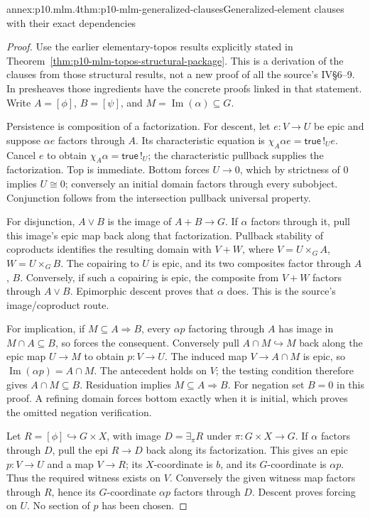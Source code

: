 \begin{annexitem}{annex:p10.mlm.4}{thm:p10-mlm-generalized-clauses}{Generalized-element clauses with their exact dependencies}
\begin{proof}
Use the earlier elementary-topos results explicitly stated in
Theorem~\ref{thm:p10-mlm-topos-structural-package}.
This is a derivation of the clauses from those structural results, not a
new proof of all the source's IV\S6--9. In presheaves those ingredients have
the concrete proofs linked in that statement.
Write \(A=[\phi]\), \(B=[\psi]\), and \(M=\operatorname{Im}(\alpha)\subseteq G\).

Persistence is composition of a factorization. For descent, let \(e:V\to U\)
be epic and suppose \(\alpha e\) factors through \(A\). Its characteristic
equation is \(\chi_A\alpha e=\mathsf{true}\,!_Ue\). Cancel \(e\) to obtain
\(\chi_A\alpha=\mathsf{true}\,!_U\); the characteristic pullback supplies
the factorization. Top is immediate. Bottom forces \(U\to0\), which by
strictness of \(0\) implies \(U\cong0\); conversely an initial domain
factors through every subobject. Conjunction follows from the intersection
pullback universal property.

For disjunction, \(A\vee B\) is the image of \(A+B\to G\).
If \(\alpha\) factors through it, pull this image's epic map back along that
factorization. Pullback stability of coproducts identifies the resulting
domain with \(V+W\), where \(V=U\times_G A\), \(W=U\times_G B\).
The copairing to \(U\) is epic, and its two composites factor through \(A\),
\(B\). Conversely, if such a copairing is epic, the composite from \(V+W\)
factors through \(A\vee B\). Epimorphic descent proves that \(\alpha\) does.
This is the source's image/coproduct route.

For implication, if \(M\subseteq A\Rightarrow B\), every \(\alpha p\) factoring
through \(A\) has image in \(M\cap A\subseteq B\), so forces the consequent.
Conversely pull \(A\cap M\hookrightarrow M\) back along the epic map
\(U\to M\) to obtain \(p:V\to U\). The induced map \(V\to A\cap M\) is
epic, so \(\operatorname{Im}(\alpha p)=A\cap M\). The antecedent holds
on \(V\); the testing condition therefore gives \(A\cap M\subseteq B\).
Residuation implies \(M\subseteq A\Rightarrow B\).
For negation set \(B=0\) in this proof. A refining domain forces bottom
exactly when it is initial, which proves the omitted negation verification.

Let \(R=[\phi]\hookrightarrow G\times X\), with image \(D=\exists_\pi R\)
under \(\pi:G\times X\to G\). If \(\alpha\) factors through \(D\), pull the
epi \(R\to D\) back along its factorization. This gives an epic \(p:V\to U\)
and a map \(V\to R\); its \(X\)-coordinate is \(b\), and its
\(G\)-coordinate is \(\alpha p\). Thus the required witness exists on \(V\).
Conversely the given witness map factors through \(R\), hence its
\(G\)-coordinate \(\alpha p\) factors through \(D\). Descent proves forcing
on \(U\). No section of \(p\) has been chosen.


\end{proof}
\end{annexitem}
